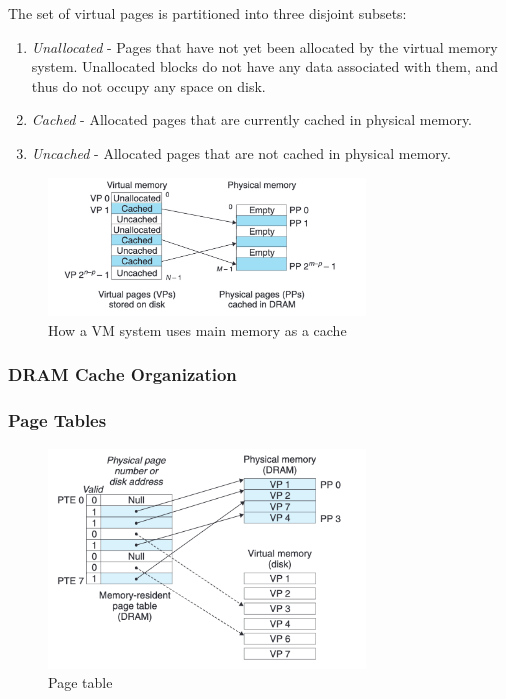 \documentclass[../main.tex]{subfiles}
\begin{document}
The set of virtual pages is partitioned into three disjoint subsets:
\begin{enumerate}
    \item \textit{Unallocated} - Pages that have not yet been allocated by the virtual memory system. Unallocated blocks do not have any data associated with them, and thus do not occupy any space on disk.
    \item \textit{Cached} - Allocated pages that are currently cached in physical memory.
    \item \textit{Uncached} - Allocated pages that are not cached in physical memory.
\end{enumerate}

\begin{figure}[H]
    \centering
    \includegraphics[width=0.75\textwidth]{graphics/Figure 4.3.png}
    \caption{How a VM system uses main memory as a cache}
    \label{fig:43}
\end{figure}

\subsubsection*{DRAM Cache Organization}



\subsubsection*{Page Tables}

\begin{figure}[H]
    \centering
    \includegraphics[width=0.75\textwidth]{graphics/Figure 4.4.png}
    \caption{Page table}
    \label{fig:44}
\end{figure}
\end{document}
